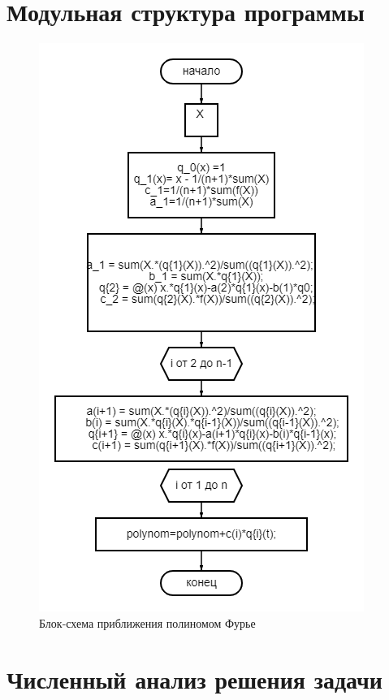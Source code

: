 \documentclass[a4paper]{article}
\begin{document}
\newpage
\section{Модульная структура программы} 
 
\begin{figure}[h!]
\begin{center}
\includegraphics[scale=0.7]{diagram (6).png} 
 \end{center}
\caption{Блок-схема приближения полиномом Фурье} \label{Рис1}
\end{figure}


\newpage
\section{Численный анализ решения задачи}
\end{document}
